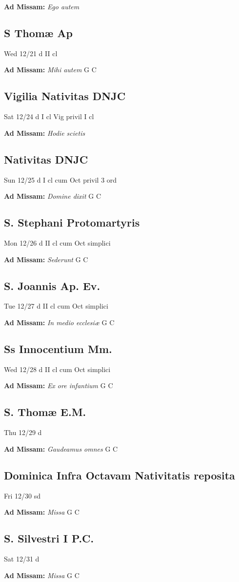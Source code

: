 \documentclass[letterpaper, 10pt, twocolumn]{article}
\begin{document}
\textbf{Ad Missam:} \textit{Ego autem} 

\subsection*{S Thomæ Ap}Wed 12/21 d II cl

\textbf{Ad Missam:} \textit{Mihi autem} G C 

\subsection*{Vigilia Nativitas DNJC}Sat 12/24 d I cl Vig privil I cl

\textbf{Ad Missam:} \textit{Hodie scietis} 

\subsection*{Nativitas DNJC}Sun 12/25 d I cl cum Oct privil 3 ord

\textbf{Ad Missam:} \textit{Domine dixit} G C 

\subsection*{S. Stephani Protomartyris}Mon 12/26 d II cl cum Oct simplici

\textbf{Ad Missam:} \textit{Sederunt} G C 

\subsection*{S. Joannis Ap. Ev.}Tue 12/27 d II cl cum Oct simplici

\textbf{Ad Missam:} \textit{In medio ecclesiæ} G C 

\subsection*{Ss Innocentium Mm.}Wed 12/28 d II cl cum Oct simplici

\textbf{Ad Missam:} \textit{Ex ore infantium} G C 

\subsection*{S. Thomæ E.M.}Thu 12/29 d

\textbf{Ad Missam:} \textit{Gaudeamus omnes} G C 

\subsection*{Dominica Infra Octavam Nativitatis reposita}Fri 12/30 sd

\textbf{Ad Missam:} \textit{Missa} G C 

\subsection*{S. Silvestri I P.C.}Sat 12/31 d

\textbf{Ad Missam:} \textit{Missa} G C 
\end{document}
